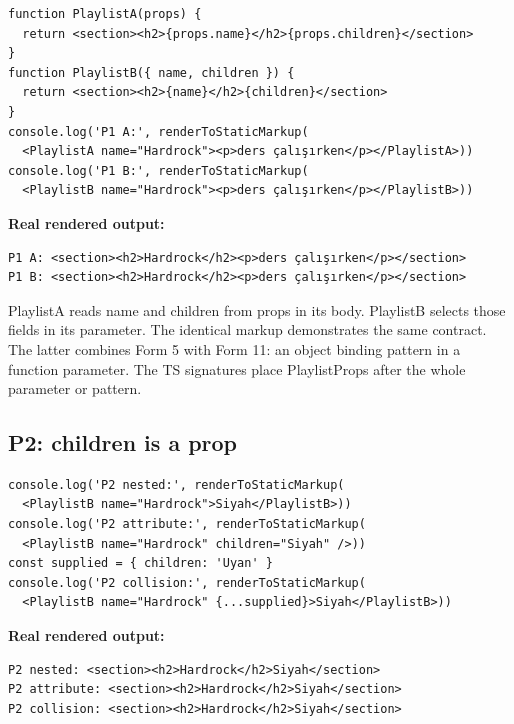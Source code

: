 \documentclass[
  10pt,
  a4paper,
  titlepage]{article}
\begin{document}
\Needspace{82.4pt}
\begin{lstlisting}[language=JSX]
function PlaylistA(props) {
  return <section><h2>{props.name}</h2>{props.children}</section>
}
function PlaylistB({ name, children }) {
  return <section><h2>{name}</h2>{children}</section>
}
console.log('P1 A:', renderToStaticMarkup(
  <PlaylistA name="Hardrock"><p>ders çalışırken</p></PlaylistA>))
console.log('P1 B:', renderToStaticMarkup(
  <PlaylistB name="Hardrock"><p>ders çalışırken</p></PlaylistB>))
\end{lstlisting}


\textbf{Real rendered output:}

\Needspace{41.2pt}
\begin{lstlisting}
P1 A: <section><h2>Hardrock</h2><p>ders çalışırken</p></section>
P1 B: <section><h2>Hardrock</h2><p>ders çalışırken</p></section>
\end{lstlisting}

PlaylistA reads name and children from props in its body. PlaylistB
selects those fields in its parameter. The identical markup demonstrates
the same contract. The latter combines Form 5 with Form 11: an object
binding pattern in a function parameter. The TS signatures place
PlaylistProps after the whole parameter or pattern.

\subsection{P2: children is a prop}\label{p2-children-is-a-prop}

\Needspace{82.4pt}
\begin{lstlisting}[language=JSX]
console.log('P2 nested:', renderToStaticMarkup(
  <PlaylistB name="Hardrock">Siyah</PlaylistB>))
console.log('P2 attribute:', renderToStaticMarkup(
  <PlaylistB name="Hardrock" children="Siyah" />))
const supplied = { children: 'Uyan' }
console.log('P2 collision:', renderToStaticMarkup(
  <PlaylistB name="Hardrock" {...supplied}>Siyah</PlaylistB>))
\end{lstlisting}


\textbf{Real rendered output:}

\Needspace{51.5pt}
\begin{lstlisting}
P2 nested: <section><h2>Hardrock</h2>Siyah</section>
P2 attribute: <section><h2>Hardrock</h2>Siyah</section>
P2 collision: <section><h2>Hardrock</h2>Siyah</section>
\end{lstlisting}
\end{document}
